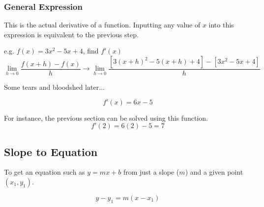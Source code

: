 \documentclass[a4paper,12pt]{article}
\begin{document}
\subsubsection{General Expression}
This is the actual derivative of a function. Inputting any value of $x$ into this expression is equivalent to the previous step.

e.g. $f(x) = 3x^2 - 5x + 4$, find $f'(x)$
$$\lim\limits_{h\to0}\frac{f(x+h)-f(x)}{h} \longrightarrow \lim\limits_{h\to0}\frac{[3(x+h)^2 - 5(x+h) + 4] - [3x^2 - 5x + 4]}{h}$$
\begin{center}Some tears and bloodshed later...\end{center}
$$f'(x) = 6x-5$$

For instance, the previous section can be solved using this function.
$$f'(2) = 6(2) - 5 = 7$$

\subsection{Slope to Equation}
To get an equation such as $y=mx+b$ from just a slope ($m$) and a given point $(x_1, y_1)$.

$$y - y_1 = m(x - x_1)$$
\end{document}
